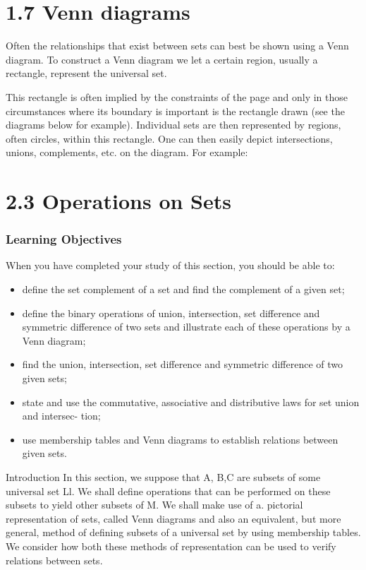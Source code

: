 \documentclass{beamer}
\begin{document}
\begin{frame}
\begin{frame}
\section{1.7 Venn diagrams}
Often the relationships that exist between sets can best be shown using a
Venn diagram. To construct a Venn diagram we let a certain region, usually
a rectangle, represent the universal set. 

This rectangle is often implied
by the constraints of the page and only in those circumstances where its
boundary is important is the rectangle drawn (see the diagrams below for
example). Individual sets are then represented by regions, often circles,
within this rectangle. One can then easily depict intersections, unions,
complements, etc. on the diagram. For example:

\section{2.3 Operations on Sets}
\frametitle{Learning Objectives}
When you have completed your study of this section, you should be able to:
\begin{itemize}
\item deﬁne the set complement of a set and ﬁnd the complement of a given set;
\item deﬁne the binary operations of union, intersection, set difference and symmetric difference of
two sets and illustrate each of these operations by a Venn diagram;
\item  ﬁnd the union, intersection, set difference and symmetric difference of two given sets;
\item  state and use the commutative, associative and distributive laws for set union and intersec-
tion;
\item  use membership tables and Venn diagrams to establish relations between given sets.
\end{itemize}

\end{frame}
Introduction
In this section, we suppose that A, B,C are subsets of some universal set Ll. We shall deﬁne
operations that can be performed on these subsets to yield other subsets of M. We shall make
use of a. pictorial representation of sets, called Venn diagrams and also an equivalent, but more
general, method of deﬁning subsets of a universal set by using membership tables. We consider
how both these methods of representation can be used to verify relations between sets.




\end{frame}
\end{document}
